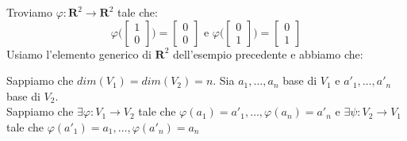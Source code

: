 \begin{example}
	Troviamo $\varphi:\mathbf{R}^2\rightarrow\mathbf{R}^2$ tale che:
	\begin{equation*}
		\varphi \bigg(
		\begin{bmatrix}
			1 \\ 0
		\end{bmatrix}
		\bigg) = 
		\begin{bmatrix}
			0 \\ 0
		\end{bmatrix}
		\text{ e }
		\varphi \bigg(
		\begin{bmatrix}
			0 \\ 1
		\end{bmatrix}
		\bigg) = 
		\begin{bmatrix}
			0 \\ 1
		\end{bmatrix}
	\end{equation*}
	Usiamo l'elemento generico di $\mathbf{R}^2$ dell'esempio precedente e abbiamo che:
\end{example}
\begin{observation}
	Sappiamo che $dim(V_1) = dim(V_2) = n$. Sia $a_1, \hdots, a_n$ base di $V_1$ e $a'_1, \hdots, a'_n$ base di $V_2$. \\
	Sappiamo che $\exists \varphi: V_1 \rightarrow V_2$ tale che $\varphi(a_1) = a'_1, \hdots, \varphi(a_n)=a'_n$ e $\exists \psi: V_2 \rightarrow V_1$ tale che $\varphi(a'_1) = a_1, \hdots, \varphi(a'_n)=a_n$ %
\end{observation}
